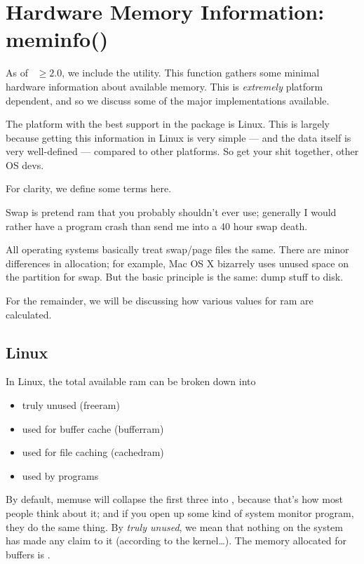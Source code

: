 \section{Hardware Memory Information: meminfo()}

As of ~$\geq 2.0$, we include the  utility.  This function gathers some minimal hardware information about available memory.  This is \emph{extremely} platform dependent, and so we discuss some of the major implementations available.  

The platform with the best support in the  package is Linux.  This is largely because getting this information in Linux is very simple --- and the data itself is very well-defined --- compared to other platforms.  So get your shit together, other OS devs.

For clarity, we define some terms here.

Swap is pretend ram that you probably shouldn't ever use; generally I would rather have a program crash than send me into a 40 hour swap death.

All operating systems basically treat swap/page files the same.  There are minor differences in allocation; for example, Mac OS X bizarrely uses unused space on the  partition for swap.  But the basic principle is the same: dump stuff to disk.

For the remainder, we will be discussing how various values for ram are calculated.



\subsection{Linux}
In Linux, the total available ram can be broken down into
\begin{itemize}
  \item truly unused (freeram)
  \item used for buffer cache (bufferram)
  \item used for file caching (cachedram)
  \item used by programs
\end{itemize}

By default, memuse will collapse the first three into , because that's how most people think about it; and if you open up some kind of system monitor program, they do the same thing.  By \emph{truly unused}, we mean that nothing on the system has made any claim to it (according to the kernel\dots).  The memory allocated for buffers is .

